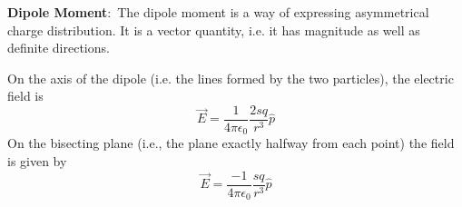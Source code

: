 \documentclass[nobib]{tufte-handout}
\newcommand{\defn}[2]{\textbf{#1}:\ #2}
\begin{document}
\defn{Dipole Moment}{The dipole moment is a way of expressing asymmetrical charge distribution.
It is a vector quantity, i.e. it has magnitude as well as definite directions.}

On the axis of the dipole (i.e. the lines
formed by the two particles), the electric field is 
\[\vec{E} = \frac{1}{4\pi \epsilon_0}\frac{2sq}{r^3}\hat{p}\]
On the bisecting plane (i.e., the plane exactly halfway from each 
point) the field is given by
\[\vec{E} = \frac{-1}{4 \pi \epsilon_0}\frac{sq}{r^3}\hat{p}\]

\marginnote{}
\end{document}
